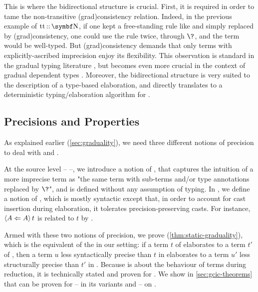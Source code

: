 This is where the bidirectional structure is crucial.
First, it is required in order to tame the non-transitive \kl(grad){consistency} relation.
Indeed, in the previous example of $\asc{\true}{\Nat}$, if one kept a free-standing rule like
 and simply replaced  by \kl(grad){consistency}, one could
use the rule twice, through $\?$, and the term would be well-typed.
But \kl(grad){consistency} demands that only terms with explicitly-ascribed
imprecision enjoy its flexibility.
This observation is standard in the gradual typing literature
, but becomes even more crucial in the context of
gradual dependent types .
Moreover, the bidirectional structure is very suited to the description of
a type-based elaboration, and directly translates to a deterministic typing/elaboration
algorithm for .

\subsection{Precisions and Properties}
\label{sec:precision-graduality}

As explained earlier (\cref{sec:graduality}), we need three different notions of
precision to deal with  and .

At the source level –  –,
we introduce a notion of , that captures the
intuition of a more imprecise term as "the same term with sub-terms and/or
type annotations replaced by $\?$", and is defined without any assumption of typing.
In , we define a notion of ,
which is mostly syntactic except that, in order to account for cast insertion during elaboration, it tolerates precision-preserving casts.
For instance, $\castrev{t}{A}{A}$ is related to $t$ by .

Armed with these two notions of precision, we prove
 (\cref{thm:static-graduality}), which is
the equivalent of the  in our setting:
if a term $t$ of  elaborates to a term $t'$ of ,
then a term $u$ less syntactically precise than $t$ in  elaborates to
a term $u'$ less structurally precise than $t'$ in .
%
Because  is about the behaviour of terms during reduction,
it is technically stated and proven for .
We show in \cref{sec:gcic-theorems} that  can be proven
for  – in its variants  and  – on .

